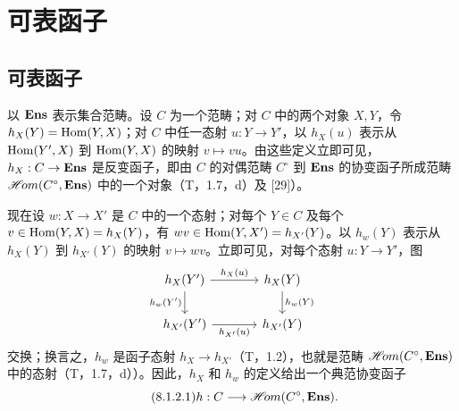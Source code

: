 \renewcommand{\B}{\mathscr B}
\setcounter{section}{7}
\section{可表函子}
\subsection{可表函子}
以 $\mathbf{Ens}$ 表示集合范畴。设 $C$ 为一个范畴；对 $C$ 中的两个对象 $X,Y$，令 $h_X(Y)=\operatorname{Hom}(Y,X)$；对 $C$ 中任一态射 $u:Y\to Y'$，以 $h_X(u)$ 表示从 $\operatorname{Hom}(Y',X)$ 到 $\operatorname{Hom}(Y,X)$ 的映射 $v\mapsto vu$。由这些定义立即可见，$h_X:C\to\mathbf{Ens}$ 是反变函子，即由 $C$ 的对偶范畴 $C^\circ$ 到 $\mathbf{Ens}$ 的协变函子所成范畴 $\mathscr{H}\!om(C^\circ,\mathbf{Ens})$ 中的一个对象（T，1.7，d）及 [29]）。

现在设 $w:X\to X'$ 是 $C$ 中的一个态射；对每个 $Y\in C$ 及每个 $v\in\operatorname{Hom}(Y,X)=h_X(Y)$，有 $wv\in\operatorname{Hom}(Y,X')=h_{X'}(Y)$。以 $h_w(Y)$ 表示从 $h_X(Y)$ 到 $h_{X'}(Y)$ 的映射 $v\mapsto wv$。立即可见，对每个态射 $u:Y\to Y'$，图
\[
\begin{tikzcd}[column sep=large]
h_X(Y')\arrow[r,"h_X(u)"]\arrow[d,"h_w(Y')"']&h_X(Y)\arrow[d,"h_w(Y)"]\\
h_{X'}(Y')\arrow[r,"h_{X'}(u)"']&h_{X'}(Y)
\end{tikzcd}
\]
交换；换言之，$h_w$ 是函子态射 $h_X\to h_{X'}$（T，1.2），也就是范畴 $\mathscr{H}\!om(C^\circ,\mathbf{Ens})$ 中的态射（T，1.7，d））。因此，$h_X$ 和 $h_w$ 的定义给出一个典范协变函子
\begin{equation}\tag{8.1.2.1}
h:C\longrightarrow\mathscr{H}\!om(C^\circ,\mathbf{Ens}).
\end{equation}

